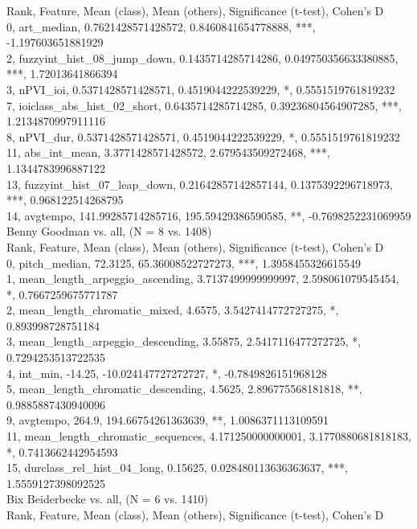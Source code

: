 Rank, Feature, Mean (class), Mean (others), Significance (t-test), Cohen's D\\
0, art_median, 0.7621428571428572, 0.8460841654778888, ***, -1.197603651881929\\
2, fuzzyint_hist_08_jump_down, 0.1435714285714286, 0.049750356633380885, ***, 1.72013641866394\\
3, nPVI_ioi, 0.5371428571428571, 0.4519044222539229, *, 0.5551519761819232\\
7, ioiclass_abs_hist_02_short, 0.6435714285714285, 0.39236804564907285, ***, 1.2134870997911116\\
8, nPVI_dur, 0.5371428571428571, 0.4519044222539229, *, 0.5551519761819232\\
11, abs_int_mean, 3.3771428571428572, 2.679543509272468, ***, 1.1344783996887122\\
13, fuzzyint_hist_07_leap_down, 0.21642857142857144, 0.1375392296718973, ***, 0.968122514268795\\
14, avgtempo, 141.99285714285716, 195.59429386590585, **, -0.7698252231069959\\
Benny Goodman vs. all, (N = 8 vs. 1408)\\
Rank, Feature, Mean (class), Mean (others), Significance (t-test), Cohen's D\\
0, pitch_median, 72.3125, 65.36008522727273, ***, 1.3958455326615549\\
1, mean_length_arpeggio_ascending, 3.7137499999999997, 2.598061079545454, *, 0.7667259675771787\\
2, mean_length_chromatic_mixed, 4.6575, 3.5427414772727275, *, 0.893998728751184\\
3, mean_length_arpeggio_descending, 3.55875, 2.5417116477272725, *, 0.7294253513722535\\
4, int_min, -14.25, -10.024147727272727, *, -0.7849826151968128\\
5, mean_length_chromatic_descending, 4.5625, 2.896775568181818, **, 0.9885887430940096\\
9, avgtempo, 264.9, 194.66754261363639, **, 1.0086371113109591\\
11, mean_length_chromatic_sequences, 4.171250000000001, 3.1770880681818183, *, 0.7413662442954593\\
15, durclass_rel_hist_04_long, 0.15625, 0.028480113636363637, ***, 1.5559127398092525\\
Bix Beiderbecke vs. all, (N = 6 vs. 1410)\\
Rank, Feature, Mean (class), Mean (others), Significance (t-test), Cohen's D\\
